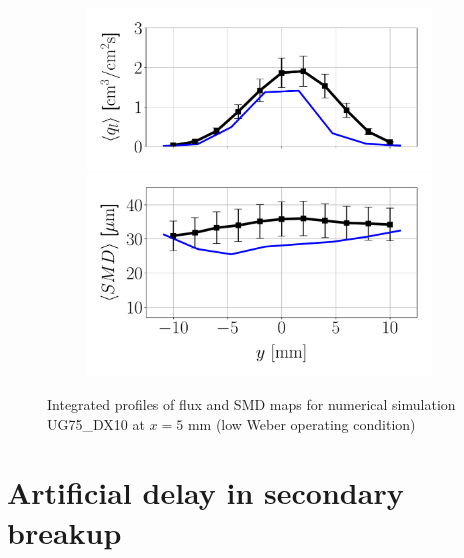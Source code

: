 \begin{figure}[ht]
\begin{subfigure}[b]{0.4\textwidth}
	\flushleft
   \includegraphics[scale=0.35]{./part2_developments/figures_ch6_lagrangian_JICF/params_OP/profiles/flux_along_y}\\
   \vspace{-0.16in}
   \includegraphics[scale=0.35]{./part2_developments/figures_ch6_lagrangian_JICF/params_OP/profiles/SMD_along_y}
\end{subfigure}

\caption{Integrated profiles of flux and SMD maps for numerical simulation UG75\_DX10 at $x = 5$ mm (low Weber operating condition)}
\label{fig:profiles_LGS_JICF_OP}
\end{figure}


\section{Artificial delay in secondary breakup}
\label{sec:LGS_delay_secon_atom}

